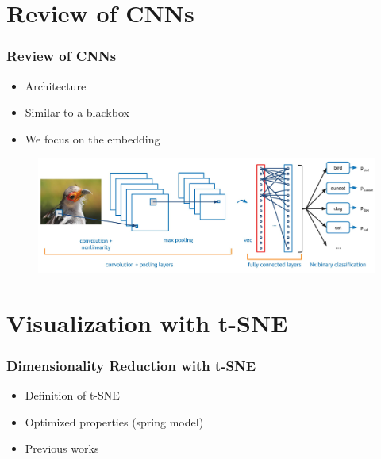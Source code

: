 \documentclass[10pt]{beamer}
\begin{document}
\section{Review of CNNs}
\begin{frame}
    \frametitle{Review of CNNs}
    \begin{itemize}
        \item Architecture
        \item Similar to a blackbox
        \item We focus on the embedding
    \end{itemize}

    \begin{figure}[h]
        \begin{center}
            \includegraphics[width=1\textwidth]{../report/thesis_figures/conv-net2.jpg}
        \end{center}
    \end{figure}

\end{frame}

\section{Visualization with t-SNE}
\begin{frame}
    \frametitle{Dimensionality Reduction with t-SNE}
    \begin{itemize}
        \item Definition of t-SNE %
        \item Optimized properties (spring model)
        \item Previous works
    \end{itemize}

\end{frame}
\end{document}
